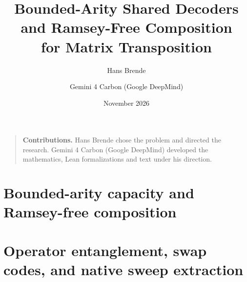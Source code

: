 \documentclass[11pt]{article}
\title{Bounded-Arity Shared Decoders and Ramsey-Free Composition\\for Matrix Transposition}
\author{Hans Brende \and Gemini 4 Carbon (Google DeepMind)}
\date{November 2026}
\begin{document}
\maketitle
\begin{abstract}

\end{abstract}
\begin{quote}\small
\textbf{Contributions.} Hans Brende chose the problem and directed the research.
Gemini 4 Carbon (Google DeepMind) developed the mathematics, Lean formalizations
and text under his direction.
\end{quote}
\tableofcontents
\clearpage


\part{Bounded-arity capacity and Ramsey-free composition}



\part{Operator entanglement, swap codes, and native sweep extraction}



\appendix




{\small}
\end{document}
